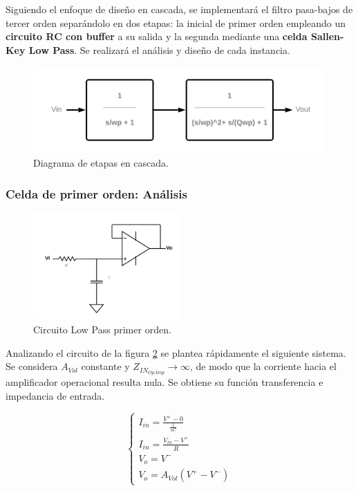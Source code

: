 Siguiendo el enfoque de diseño en cascada, se implementará el filtro pasa-bajos de tercer orden separándolo en dos etapas: la inicial de primer orden empleando un \textbf{circuito RC con buffer} a su salida y la segunda mediante una \textbf{celda Sallen-Key Low Pass}. Se realizará el análisis y diseño de cada instancia. 

\begin{figure}[H]
    \centering
    \includegraphics[scale = 0.4]{../Ejercicio2-DisenoDeCeldas/1CeldaSallenKey/images/Etapas.png}
    \caption{Diagrama de etapas en cascada.}
    \label{fig:etapas}
\end{figure}


\subsubsection{Celda de primer orden: Análisis}

\begin{figure}[H]
    \centering
    \includegraphics[width= 0.5\textwidth]{../Ejercicio2-DisenoDeCeldas/1CeldaSallenKey/images/LowPassRC.png}
    \caption{Circuito Low Pass primer orden.}
    \label{fig:1LPGain}
\end{figure}

Analizando el circuito de la figura \ref{fig:1LPGain} se plantea rápidamente el siguiente sistema. Se considera $A_{Vol}$ constante y $Z_{IN_{OpAmp}}\rightarrow \infty$, de modo que la corriente hacia el amplificador operacional resulta nula. Se obtiene su función transferencia e impedancia de entrada.

\begin{equation}
\left\{\begin{matrix}
        I_{in} = \frac{V^{+}-0}{\frac{1}{sC}}
        \\
        I_{in} = \frac{V_{in} - V^{+} }{R}
        \\
        V_{o} = V^{-}
        \\
        V_{o}=A_{Vol} (V^{+} - V^{-})
\end{matrix}\right.
    \label{eq:SK5}
\end{equation}


